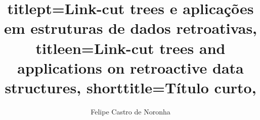 

\title{
    titlept={Link-cut trees e aplicações em estruturas de dados retroativas},
    titleen={Link-cut trees and applications on retroactive data structures},
    shorttitle={Título curto},
}

\author[mas]{Felipe Castro de Noronha}



